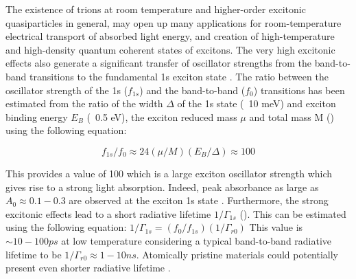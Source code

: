 The existence of trions at room temperature and higher-order excitonic quasiparticles  in general, may open up many applications for room-temperature electrical transport of absorbed light energy, and creation of high-temperature and high-density quantum coherent states of excitons.
The very high excitonic effects also generate a significant transfer of oscillator strengths from the band-to-band transitions to the fundamental 1s exciton state \cite{Haug1994}. The ratio between the oscillator strength of the 1s ($f_{1s}$) and the band-to-band ($f_0$) transitions has been estimated  from the ratio of the width $\Delta$ of the 1s state (~10 meV) and exciton binding energy $E_B$ (~0.5 eV), the exciton reduced mass $\mu$ and total mass M (\cite{Feldmann1988}\cite{Haug1989}) using the following equation:

\begin{equation}
f_{1s}/f_0 \approx 24({\mu}/M)(E_B/{\Delta}) \approx 100
\end{equation} 
 
This provides a value of 100 which is a large exciton oscillator strength which gives rise to a strong light absorption. Indeed, peak absorbance as large as $A_0 \approx 0.1-0.3$ are observed at the exciton 1s state \cite{AtomicallyThinMoS2ANewDirect-GapSemiconductor}\cite{Mak2012}. Furthermore, the strong excitonic effects lead to a  short radiative lifetime $1/{\Gamma}_{1s}$ (\cite{Feldmann1988}\cite{Haug1989}). This can be estimated using the following equation: $1/{\Gamma}_{1s} = (f_0/f_{1s})(1/{\Gamma}_{r0})$
This value is $\sim 10-100 ps$ at low temperature considering a typical band-to-band radiative lifetime to be $1/{\Gamma}_{r0} \approx 1-10 ns$. Atomically pristine materials could potentially present even shorter radiative lifetime \cite{Feldmann1987}\cite{Mak2016}.

